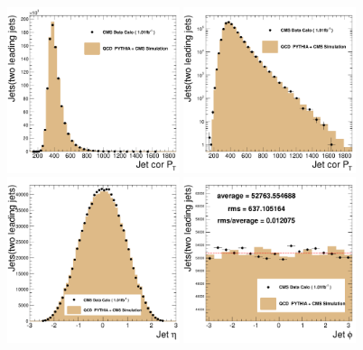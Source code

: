 \begin{figure}[!ht]
  \begin{center}
    \includegraphics[width=0.45\textwidth]{Figures/c_corPt.pdf}
    \includegraphics[width=0.45\textwidth]{Figures/c_corPt_log.pdf}
    \includegraphics[width=0.45\textwidth]{Figures/c_Eta.pdf}
    \includegraphics[width=0.45\textwidth]{Figures/c_Phi.pdf}

\end{center}
\end{figure}
